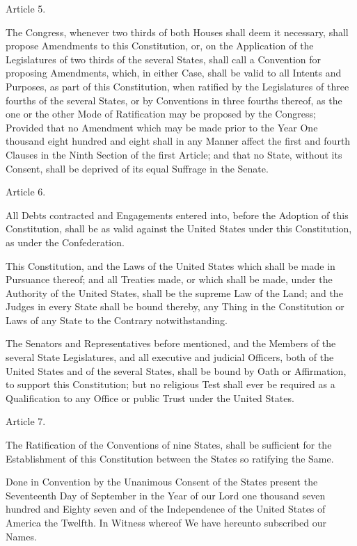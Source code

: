 \documentclass[12pt,a4paper]{article}
\begin{document}
Article 5.

The Congress, whenever two thirds of both Houses shall deem it necessary, shall
propose Amendments to this Constitution, or, on the Application of the
Legislatures of two thirds of the several States, shall call a Convention for
proposing Amendments, which, in either Case, shall be valid to all Intents and
Purposes, as part of this Constitution, when ratified by the Legislatures of
three fourths of the several States, or by Conventions in three fourths
thereof, as the one or the other Mode of Ratification may be proposed by the
Congress; Provided that no Amendment which may be made prior to the Year One
thousand eight hundred and eight shall in any Manner affect the first and
fourth Clauses in the Ninth Section of the first Article; and that no State,
without its Consent, shall be deprived of its equal Suffrage in the Senate.

Article 6.

All Debts contracted and Engagements entered into, before the Adoption of this
Constitution, shall be as valid against the United States under this
Constitution, as under the Confederation.

This Constitution, and the Laws of the United States which shall be made in
Pursuance thereof; and all Treaties made, or which shall be made, under the
Authority of the United States, shall be the supreme Law of the Land; and the
Judges in every State shall be bound thereby, any Thing in the Constitution or
Laws of any State to the Contrary notwithstanding.

The Senators and Representatives before mentioned, and the Members of the
several State Legislatures, and all executive and judicial Officers, both of
the United States and of the several States, shall be bound by Oath or
Affirmation, to support this Constitution; but no religious Test shall ever be
required as a Qualification to any Office or public Trust under the United
States.

Article 7.

The Ratification of the Conventions of nine States, shall be sufficient for the
Establishment of this Constitution between the States so ratifying the Same.

Done in Convention by the Unanimous Consent of the States present the
Seventeenth Day of September in the Year of our Lord one thousand seven hundred
and Eighty seven and of the Independence of the United States of America the
Twelfth. In Witness whereof We have hereunto subscribed our Names.
\end{document}
